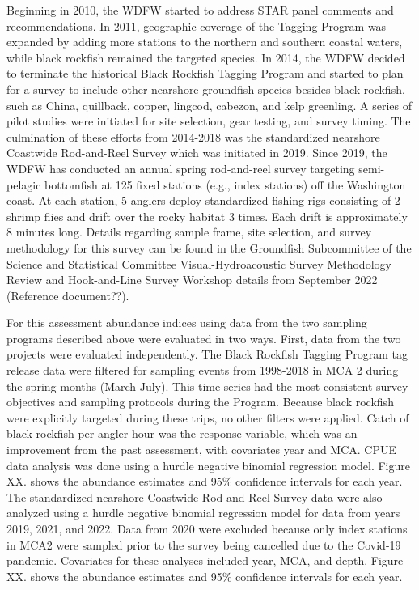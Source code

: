 \documentclass[11pt,
  english,
  letterpaper,
]{article}
\begin{document}
Beginning in 2010, the WDFW started to address STAR panel comments and recommendations. In 2011, geographic coverage of the Tagging Program was expanded by adding more stations to the northern and southern coastal waters, while black rockfish remained the targeted species. In 2014, the WDFW decided to terminate the historical Black Rockfish Tagging Program and started to plan for a survey to include other nearshore groundfish species besides black rockfish, such as China, quillback, copper, lingcod, cabezon, and kelp greenling. A series of pilot studies were initiated for site selection, gear testing, and survey timing. The culmination of these efforts from 2014-2018 was the standardized nearshore Coastwide Rod-and-Reel Survey which was initiated in 2019. Since 2019, the WDFW has conducted an annual spring rod-and-reel survey targeting semi-pelagic bottomfish at 125 fixed stations (e.g., index stations) off the Washington coast. At each station, 5 anglers deploy standardized fishing rigs consisting of 2 shrimp flies and drift over the rocky habitat 3 times. Each drift is approximately 8 minutes long. Details regarding sample frame, site selection, and survey methodology for this survey can be found in the Groundfish Subcommittee of the Science and Statistical Committee Visual-Hydroacoustic Survey Methodology Review and Hook-and-Line Survey Workshop details from September 2022 (Reference document??).

For this assessment abundance indices using data from the two sampling programs described above were evaluated in two ways. First, data from the two projects were evaluated independently. The Black Rockfish Tagging Program tag release data were filtered for sampling events from 1998-2018 in MCA 2 during the spring months (March-July). This time series had the most consistent survey objectives and sampling protocols during the Program. Because black rockfish were explicitly targeted during these trips, no other filters were applied. Catch of black rockfish per angler hour was the response variable, which was an improvement from the past assessment, with covariates year and MCA. CPUE data analysis was done using a hurdle negative binomial regression model. Figure XX. shows the abundance estimates and 95\% confidence intervals for each year. The standardized nearshore Coastwide Rod-and-Reel Survey data were also analyzed using a hurdle negative binomial regression model for data from years 2019, 2021, and 2022. Data from 2020 were excluded because only index stations in MCA2 were sampled prior to the survey being cancelled due to the Covid-19 pandemic. Covariates for these analyses included year, MCA, and depth. Figure XX. shows the abundance estimates and 95\% confidence intervals for each year.
\end{document}
